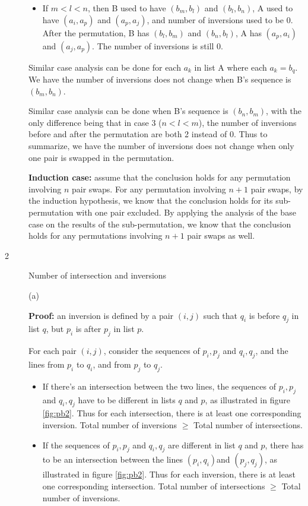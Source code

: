 \documentclass{article}
\begin{document}
\begin{description}
\begin{itemize}
  \item
  If $m < l < n$, then B used to have $(b_m, b_l)$ and $(b_l, b_n)$, A used to have $(a_i, a_p)$ and $(a_p, a_j)$, and number of inversions used to be 0. After the permutation, B has $(b_l, b_m)$ and $(b_n, b_l)$, A has $(a_p, a_i)$ and $(a_j, a_p)$. The number of inversions is still 0.
  \end{itemize}

  Similar case analysis can be done for each $a_k$ in list A where each $a_k = b_q$. We have the number of inversions does not change when B's sequence is $(b_m, b_n)$. 

  Similar case analysis can be done when B's sequence is $(b_n, b_m)$, with the only difference being that in case 3 ($n < l < m$), the number of inversions before and after the permutation are both 2 instead of 0. Thus to summarize, we have the number of inversions does not change when only one pair is swapped in the permutation.

  \textbf{Induction case:} assume that the conclusion holds for any permutation involving $n$ pair swaps. For any permutation involving $n+1$ pair swaps, by the induction hypothesis, we know that the conclusion holds for its sub-permutation with one pair excluded. By applying the analysis of the base case on the results of the sub-permutation, we know that the conclusion holds for any permutations involving $n+1$ pair swaps as well.
  

\item[2]{Number of intersection and inversions}

  (a)

  \textbf{Proof:} an inversion is defined by a pair $(i, j)$ such that $q_i$ is before $q_j$ in list $q$, but $p_i$ is after $p_j$ in list $p$. 

  For each pair $(i, j)$, consider the sequences of $p_i, p_j$ and $q_i, q_j$, and the lines from $p_i$ to $q_i$, and from $p_j$ to $q_j$. 

  \begin{itemize}
  \item
  If there's an intersection between the two lines, the sequences of $p_i, p_j$ and $q_i, q_j$ have to be different in lists $q$ and $p$, as illustrated in figure \ref{fig:pb2}. Thus for each intersection, there is at least one corresponding inversion. Total number of inversions $\geq$ Total number of intersections.

  \item
  If the sequences of $p_i, p_j$ and $q_i, q_j$ are different in list $q$ and $p$, there has to be an intersection between the lines $(p_i, q_i)$and $(p_j, q_j)$, as illustrated in figure \ref{fig:pb2}. Thus for each inversion, there is at least one corresponding intersection. Total number of intersections $\geq$ Total number of inversions.


\end{itemize}
\end{description}
\end{document}
